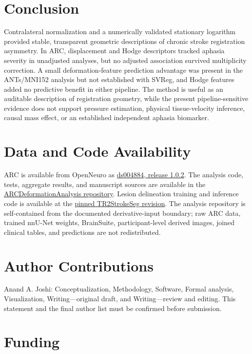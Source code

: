 \documentclass[11pt]{article}
\begin{document}
\section{Conclusion}

Contralateral normalization and a numerically validated stationary logarithm
provided stable, transparent geometric descriptions of chronic stroke
registration asymmetry. In ARC, displacement and Hodge descriptors tracked
aphasia severity in unadjusted analyses, but no adjusted association survived
multiplicity correction. A small deformation-feature prediction advantage was
present in the ANTs/MNI152 analysis but not established with SVReg, and Hodge
features added no predictive benefit in either pipeline. The method is useful
as an auditable description of registration geometry, while the present
pipeline-sensitive evidence does not support pressure estimation, physical
tissue-velocity inference, causal mass effect, or an established independent
aphasia biomarker.

\section*{Data and Code Availability}

ARC is available from OpenNeuro as
\href{https://doi.org/10.18112/openneuro.ds004884.v1.0.2}{ds004884, release
1.0.2}. The analysis code, tests, aggregate results, and manuscript sources are
available in the
\href{https://github.com/ajoshiusc/ARCDeformationAnalysis}{ARCDeformationAnalysis
repository}. Lesion delineation training and inference code is available at the
\href{https://github.com/ajoshiusc/TR2StrokeSeg/tree/286cd508f1bbbcbc3c5182db32db41a5b4797eb7}{pinned
TR2StrokeSeg revision}.
The analysis repository is self-contained from the documented derivative-input
boundary; raw ARC data, trained nnU-Net weights, BrainSuite, participant-level
derived images, joined clinical tables, and predictions are not redistributed.

\section*{Author Contributions}

Anand A. Joshi: Conceptualization, Methodology, Software, Formal analysis,
Visualization, Writing---original draft, and Writing---review and editing.
This statement and the final author list must be confirmed before submission.

\section*{Funding}
\end{document}
